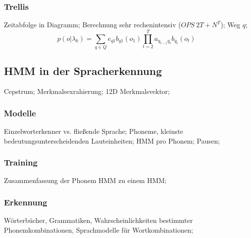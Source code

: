 \documentclass[german,color,6pt]{latex4ei/latex4ei_sheet}
\begin{document}
\begin{sectionbox}
\subsubsection{Trellis}
Zeitabfolge in Diagramm; Berechnung sehr rechenintensiv ($OPS ~ 2T + N^T$); Weg $q$;
\begin{equation*}
p(o | \lambda_k) = \sum\limits_{q \in Q} e_{q1} b_{q1} (o_1) \prod\limits^T _{t=2} a_{q_{t-1} q_t} b_{q_t} (o_t)
\end{equation*}
\end{sectionbox}

\subsection{HMM in der Spracherkennung}

\begin{symbolbox}
Cepstrum;  Merkmalsexrahierung; 12D Merkmalsvektor;
\end{symbolbox}

\begin{sectionbox}
\subsubsection{Modelle}
Einzelworterkenner vs. fließende Sprache; Phoneme, kleinste bedeutungsunterscheidenden Lauteinheiten; HMM pro Phonem; Pausen;
\end{sectionbox}

\begin{sectionbox}
\subsubsection{Training}
Zusammenfassung der Phonem HMM zu einem HMM;
\end{sectionbox}

\begin{sectionbox}
\subsubsection{Erkennung}
Wörterbücher, Grammatiken, Wahrscheinlichkeiten bestimmter Phonemkombinationen, Sprachmodelle für Wortkombinationen;
\end{sectionbox}
\end{document}
